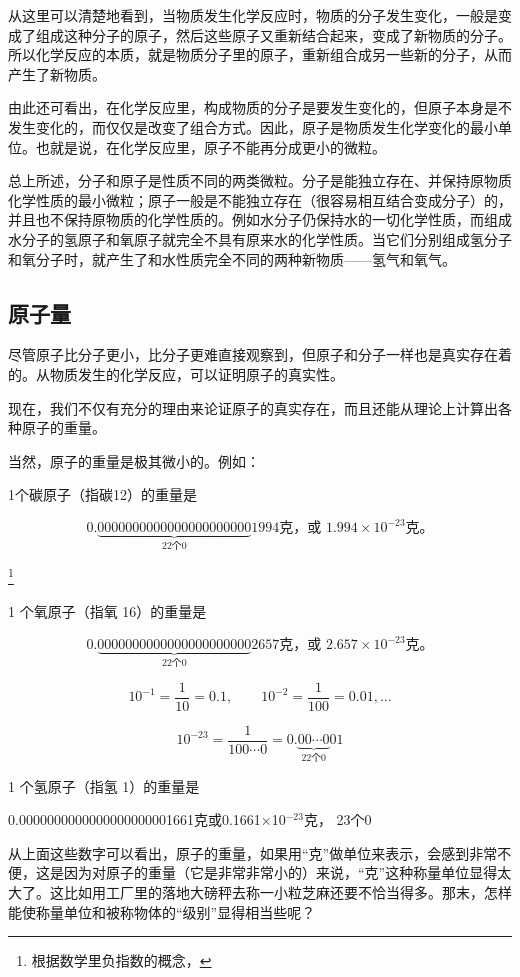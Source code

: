 从这里可以清楚地看到，当物质发生化学反应时，物质的分子发生变化，一般是变成了组成这种分子的原子，然后这些原子又重新结合起来，变成了新物质的分子。所以化学反应的本质，就是物质分子里的原子，重新组合成另一些新的分子，从而产生了新物质。

由此还可看出，在化学反应里，构成物质的分子是要发生变化的，但原子本身是不发生变化的，而仅仅是改变了组合方式。因此，原子是物质发生化学变化的最小单位。也就是说，在化学反应里，原子不能再分成更小的微粒。

总上所述，分子和原子是性质不同的两类微粒。分子是能独立存在、并保持原物质化学性质的最小微粒；原子一般是不能独立存在（很容易相互结合变成分子）的，并且也不保持原物质的化学性质的。例如水分子仍保持水的一切化学性质，而组成水分子的氢原子和氧原子就完全不具有原来水的化学性质。当它们分别组成氢分子和氧分子时，就产生了和水性质完全不同的两种新物质------氢气和氧气。

\subsection{原子量}

尽管原子比分子更小，比分子更难直接观察到，但原子和分子一样也是真实存在着的。从物质发生的化学反应，可以证明原子的真实性。

现在，我们不仅有充分的理由来论证原子的真实存在，而且还能从理论上计算出各种原子的重量。

当然，原子的重量是极其微小的。例如：

1个碳原子（指碳12）的重量是

\[
0.\underbrace{0000000000000000000000}_{22\text{个}0}1994\text{克，或 }1.994\times10^{-23}\text{克。}
\]

\footnote{根据数学里负指数的概念，}

1 个氧原子（指氧 16）的重量是

\[
0.\underbrace{0000000000000000000000}_{22\text{个}0}2657\text{克，或 }2.657\times10^{-23}\text{克。}
\]

\[
10^{-1}=\frac{1}{10}=0.1,\qquad 10^{-2}=\frac{1}{100}=0.01,\dots
\]

\[
10^{-23}=\frac{1}{100\cdots0}=0.\underbrace{00\cdots0}_{22\text{个}0}01
\]

1 个氢原子（指氢 1）的重量是

0.0000000000000000000001661克或0.1661×10\(^{-23}\)克， 23个0

从上面这些数字可以看出，原子的重量，如果用``克''做单位来表示，会感到非常不便，这是因为对原子的重量（它是非常非常小的）来说，``克''这种称量单位显得太大了。这比如用工厂里的落地大磅秤去称一小粒芝麻还要不恰当得多。那末，怎样能使称量单位和被称物体的``级别''显得相当些呢？

